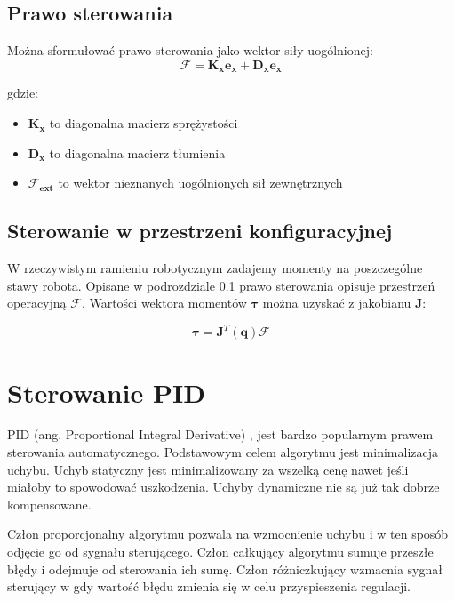 \subsection{Prawo sterowania}
\label{sec:impedancyjne}

Można sformułować prawo sterowania jako wektor siły uogólnionej:
\begin{equation}
\boldsymbol{\mathcal{F}} = \boldsymbol{K_x}\boldsymbol{e_x} + \boldsymbol{D_x}\dot{\boldsymbol{e_x}}
\end{equation}

gdzie:
\begin{itemize}
\item $\boldsymbol{K_x}$ to diagonalna macierz sprężystości
\item $\boldsymbol{D_x}$ to diagonalna macierz tłumienia
\item $\boldsymbol{\mathcal{F}_{ext}}$ to wektor nieznanych uogólnionych sił zewnętrznych
\end{itemize}

\subsection{Sterowanie w przestrzeni konfiguracyjnej}
W rzeczywistym ramieniu robotycznym zadajemy momenty na poszczególne stawy robota. Opisane w podrozdziale \ref{sec:impedancyjne} prawo sterowania opisuje przestrzeń operacyjną $\boldsymbol{\mathcal{F}}$.  Wartości wektora momentów $\boldsymbol{\tau}$ można uzyskać z jakobianu $\boldsymbol{J}$:

\begin{equation}
\boldsymbol{\tau} = \boldsymbol{J}^T(\boldsymbol{q})\boldsymbol{\mathcal{F}}
\end{equation}

\section{Sterowanie PID}
PID (ang. Proportional Integral Derivative) \cite{bib:pidTito}, \cite{bib:pidMimo} jest bardzo popularnym prawem sterowania automatycznego. Podstawowym celem algorytmu jest minimalizacja uchybu. Uchyb statyczny jest minimalizowany za wszelką cenę nawet jeśli miałoby to spowodować uszkodzenia. Uchyby dynamiczne nie są już tak dobrze kompensowane.

Człon proporcjonalny algorytmu pozwala na wzmocnienie uchybu i w ten sposób odjęcie go od sygnału sterującego. Człon całkujący algorytmu sumuje przeszłe błędy i odejmuje od sterowania ich sumę. Człon różniczkujący wzmacnia sygnał sterujący w gdy wartość błędu zmienia się w celu przyspieszenia regulacji.
